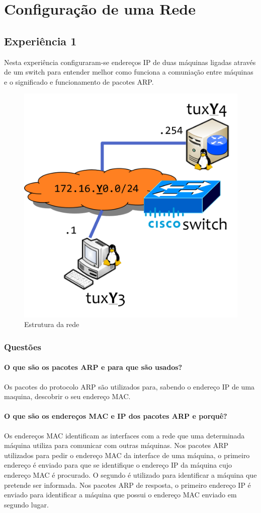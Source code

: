 \section{Configuração de uma Rede}

\subsection{Experiência 1}

Nesta experiência configuraram-se endereços IP de duas máquinas ligadas através de um switch para entender melhor como funciona a comuniação entre máquinas e o significado e funcionamento de pacotes ARP.

\begin{figure}[!h]
\centering
  \includegraphics[width=.3\linewidth]{img/exp1-net.png}
  \caption{Estrutura da rede}
\end{figure}

\subsubsection{Questões}

\paragraph{O que são os pacotes ARP e para que são usados?}
Os pacotes do protocolo ARP são utilizados para, sabendo o endereço IP de uma maquina, descobrir o seu endereço MAC. 

\paragraph{O que são os endereços MAC e IP dos pacotes ARP e porquê?}
Os endereços MAC identificam as interfaces com a rede que uma determinada máquina utiliza para comunicar com outras máquinas. Nos pacotes ARP utilizados para pedir o endereço MAC da interface de uma máquina, o primeiro endereço é enviado para que se identifique o endereço IP da máquina cujo endereço MAC é procurado. O segundo é utilizado para identificar a máquina que pretende ser informada. Nos pacotes ARP de resposta, o primeiro endereço IP é enviado para identificar a máquina que possui o endereço MAC enviado em segundo lugar.

